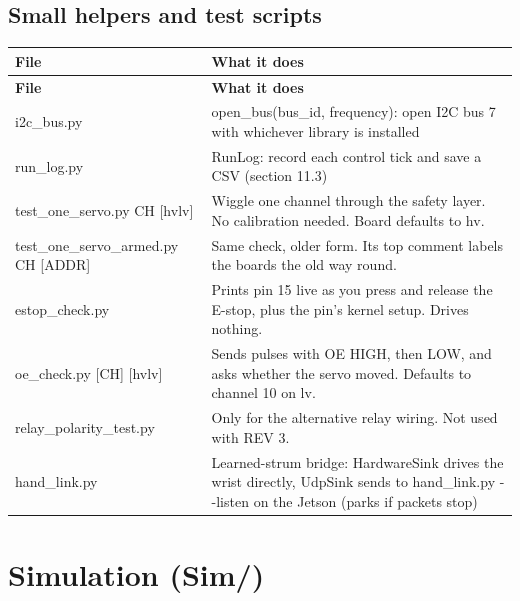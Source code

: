 \documentclass[11pt,letterpaper]{article}
\newcommand{\code}[1]{\textcolor{codeblue}{\ttfamily\smaller\relax #1}}
\begin{document}
\subsection{Small helpers and test scripts}
{\small
\begin{longtable}{|>{\raggedright\arraybackslash}p{}|>{\raggedright\arraybackslash}p{}|}
\hline
\rowcolor{tblhead}\textbf{File} & \textbf{What it does} \\ \hline
\endfirsthead
\hline
\rowcolor{tblhead}\textbf{File} & \textbf{What it does} \\ \hline
\endhead
\code{i2c\_\allowbreak{}bus.py} & \code{open\_\allowbreak{}bus(bus\_\allowbreak{}id,\allowbreak{} frequency)}: open I2C bus 7 with whichever library is installed \\ \hline
\code{run\_\allowbreak{}log.py} & \code{RunLog}: record each control tick and save a CSV (section 11.3) \\ \hline
\code{test\_\allowbreak{}one\_\allowbreak{}servo.py CH [hv\textbar{}lv]} & Wiggle one channel through the safety layer. No calibration needed. Board defaults to \code{hv}. \\ \hline
\code{test\_\allowbreak{}one\_\allowbreak{}servo\_\allowbreak{}armed.py CH [ADDR]} & Same check, older form. Its top comment labels the boards the old way round. \\ \hline
\code{estop\_\allowbreak{}check.py} & Prints pin 15 live as you press and release the E-stop, plus the pin's kernel setup. Drives nothing. \\ \hline
\code{oe\_\allowbreak{}check.py [CH] [hv\textbar{}lv]} & Sends pulses with OE HIGH, then LOW, and asks whether the servo moved. Defaults to channel 10 on \code{lv}. \\ \hline
\code{relay\_\allowbreak{}polarity\_\allowbreak{}test.py} & Only for the alternative relay wiring. Not used with REV 3. \\ \hline
\code{hand\_\allowbreak{}link.py} & Learned-strum bridge: \code{HardwareSink} drives the wrist directly, \code{UdpSink} sends to \code{hand\_\allowbreak{}link.py -{}-{}listen} on the Jetson (parks if packets stop) \\ \hline
\end{longtable}}


\section{Simulation (Sim/)}
\end{document}
